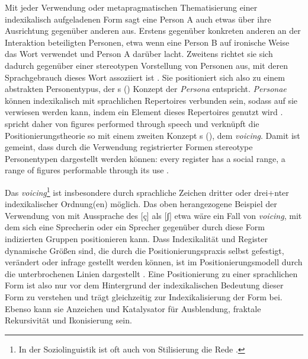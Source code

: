 Mit jeder Verwendung oder metapragmatischen Thematisierung einer indexikalisch aufgeladenen Form sagt eine Person A auch etwas über ihre Ausrichtung gegenüber anderen aus. 
Erstens gegenüber konkreten anderen an der Interaktion beteiligten Personen, etwa wenn eine Person B auf ironische Weise das Wort  verwendet und Person A darüber lacht. 
Zweitens richtet sie sich dadurch gegenüber einer stereotypen Vorstellung von Personen aus, mit deren Sprachgebrauch dieses Wort assoziiert ist \citep[s.][119]{Gal.2016}. 
Sie positioniert sich also zu einem abstrakten Personentypus, der \citeauthor{Bachtin.1990}s (\citeyear{Bachtin.1990}) Konzept der \textit{Persona} entspricht. 
\textit{Personae} können indexikalisch mit sprachlichen Repertoires verbunden sein, sodass auf sie verwiesen werden kann, indem ein Element dieses Repertoires genutzt wird \citep[s.][118]{Gal.2016}. \citet[39]
{Agha2005} spricht daher von \glqq figures performed through speech\grqq{} und verknüpft die Positionierungstheorie so mit einem zweiten Konzept \citeauthor{Bachtin.1990}s (\citeyear{Bachtin.1990}), dem \textit{voicing}. Damit ist gemeint, dass durch die Verwendung registrierter Formen stereotype Personentypen dargestellt werden können: \glqq every register has a social range, a range of figures performable through its use\grqq{} \citep[39]{Agha2005}. 

Das \textit{voicing}\footnote{In der Soziolinguistik ist oft auch von Stilisierung die Rede \citep[s. bspw.][]{Coupland.2007}.} ist insbesondere durch sprachliche Zeichen dritter oder drei+nter indexikalischer Ordnung(en) möglich. 
Das oben herangezogene Beispiel der Verwendung von  mit Aussprache des [\c{c}] als [ʃ] etwa wäre ein Fall von \textit{voicing}, mit dem sich eine Sprecherin oder ein Sprecher gegenüber durch diese Form indizierten Gruppen positionieren kann. 
Dass Indexikalität und Register dynamische Größen sind, die durch die Positionierungspraxis selbst gefestigt, verändert oder infrage gestellt werden können, ist im Positionierungsmodell durch die unterbrochenen Linien dargestellt \citep[s.][273]{Spitzmuller2013}. 
Eine Positionierung zu einer sprachlichen Form ist also nur vor dem Hintergrund der indexikalischen Bedeutung dieser Form zu verstehen und trägt gleichzeitig zur Indexikalisierung der Form bei. 
Ebenso kann sie Anzeichen und Katalysator für Ausblendung, fraktale Rekursivität und Ikonisierung sein. 
